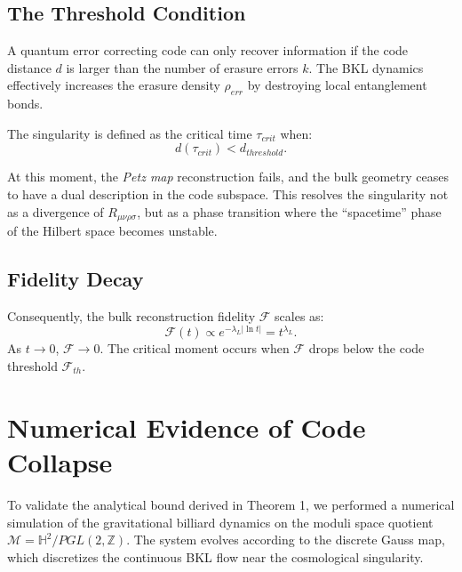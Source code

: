 \documentclass[aps,prd,reprint,nofootinbib,amsmath,amssymb,amsfonts]{revtex4-2}
\begin{document}
\subsection{The Threshold Condition}

A quantum error correcting code can only recover information if the code distance $d$ is larger than the number of erasure errors $k$. The BKL dynamics effectively increases the erasure density $\rho_{err}$ by destroying local entanglement bonds.

The singularity is defined as the critical time $\tau_{crit}$ when:
\begin{equation}
    d(\tau_{crit}) < d_{threshold}.
    \label{eq:threshold}
\end{equation}

At this moment, the \textit{Petz map} reconstruction fails, and the bulk geometry ceases to have a dual description in the code subspace. This resolves the singularity not as a divergence of $R_{\mu\nu\rho\sigma}$, but as a phase transition where the ``spacetime'' phase of the Hilbert space becomes unstable.

\subsection{Fidelity Decay}

Consequently, the bulk reconstruction fidelity $\mathcal{F}$ scales as:
\begin{equation}
    \mathcal{F}(t) \propto e^{-\lambda_L |\ln t|} = t^{\lambda_L}.
\end{equation}
As $t \to 0$, $\mathcal{F} \to 0$. The critical moment occurs when $\mathcal{F}$ drops below the code threshold $\mathcal{F}_{th}$.

\section{Numerical Evidence of Code Collapse}
\label{sec:numerical}

To validate the analytical bound derived in Theorem 1, we performed a numerical simulation of the gravitational billiard dynamics on the moduli space quotient $\mathcal{M} = \mathbb{H}^2 / PGL(2, \mathbb{Z})$. The system evolves according to the discrete Gauss map, which discretizes the continuous BKL flow near the cosmological singularity.
\end{document}
